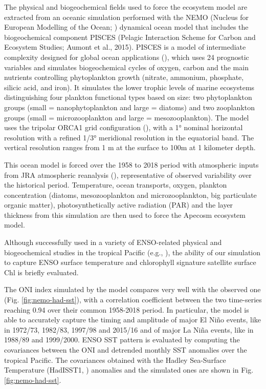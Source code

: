 The physical and biogeochemical fields used to force the ecosystem model are extracted from an oceanic simulation performed with the NEMO (Nucleus for European Modelling of the Ocean; \cite{madecNEMOOceanEngine2019}) dynamical ocean model that includes the biogeochemical component PISCES (Pelagic Interaction Scheme for Carbon and Ecosystem Studies; Aumont et al., 2015). PISCES is a model of intermediate complexity designed for global ocean applications (\cite{aumontPISCESv2OceanBiogeochemical2015}), which uses 24 prognostic variables and simulates biogeochemical cycles of oxygen, carbon and the main nutrients controlling phytoplankton growth (nitrate, ammonium, phosphate, silicic acid, and iron). It simulates the lower trophic levels of marine ecosystems distinguishing four plankton functional types based on size: two phytoplankton groups (small = nanophytoplankton and large = diatoms) and two zooplankton groups (small = microzooplankton and large = mesozooplankton). The model uses the tripolar ORCA1 grid configuration (\cite{madecGlobalOceanMesh1996}), with a 1° nominal horizontal resolution with a refined 1/3° meridional resolution in the equatorial band. The vertical resolution ranges from 1 m at the surface to 100m at 1 kilometer depth.

This ocean model is forced over the 1958 to 2018 period with atmospheric inputs from JRA atmospheric reanalysis (\cite{kobayashiJRA55ReanalysisGeneral2015}), representative of observed variability over the historical period. Temperature, ocean transports, oxygen, plankton concentration (diatoms, mesozooplankton and microzooplankton, big particulate organic matter), photosynthetically active radiation (PAR) and the layer thickness from this simulation are then used to force the Apecosm ecosystem model.

Although successfully used in a variety of ENSO-related physical and biogeochemical studies in the tropical Pacific (e.g., \cite{vialardModelStudyOceanic2001, lengaigneImpactIsopycnalMixing2003, lengaigneInfluenceOceanicBiology2007, schneiderClimateinducedInterannualVariability2008, masottiLargescaleShiftsPhytoplankton2011, currieIndianOceanDipole2013}), the ability of our simulation to capture ENSO surface temperature and chlorophyll signature satellite surface Chl is briefly evaluated. 

The ONI index simulated by the model compares very well with the observed one (Fig. \ref{fig:nemo-had-sst}), with a correlation coefficient between the two time-series reaching 0.94 over their common 1958-2018 period. In particular, the model is able to accurately capture the timing and amplitude of major El Niño events, like in 1972/73, 1982/83, 1997/98 and 2015/16 and of major La Niña events, like in 1988/89 and 1999/2000. ENSO SST pattern is evaluated  by computing the covariances between the ONI and detrended monthly SST anomalies over the tropical Pacific. The covariances obtained with the Hadley Sea-Surface Temperature (HadISST1, \cite{raynerGlobalAnalysesSea2003}) anomalies and the simulated ones are shown in Fig.\ref{fig:nemo-had-sst}.

